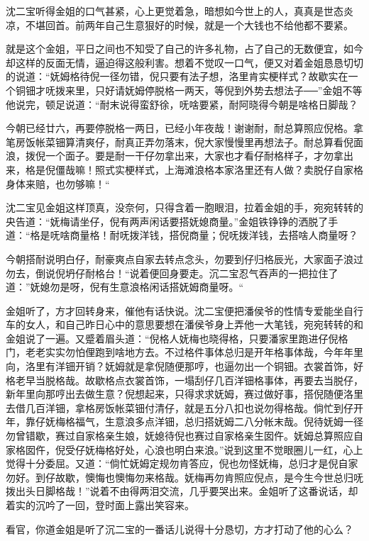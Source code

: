 \documentclass[12pt,UTF8]{ctexbook}
\begin{document}
{{{沈二宝听得金姐的口气甚紧，心上更觉着急，暗想如今世上的人，真真是世态炎凉，不堪回首。前两年自己生意狠好的时候，就是一个大钱也不给他都不要紧。

就是这个金姐，平日之间也不知受了自己的许多礼物，占了自己的无数便宜，如今却这样的反面无情，逼迫得这般利害。想着不觉叹一口气，便又对着金姐恳恳切切的说道：“妩姆格待倪一径勿错，倪只要有法子想，洛里肯实梗样式？故歇实在一个铜钿才呒拨来里，只好请妩姆停脱格一两天，等倪到外势去想法子──”金姐不等他说完，顿足说道：“耐末说得蛮舒徐，呒啥要紧，耐阿晓得今朝是啥格日脚哉？

今朝已经廿六，再要停脱格一两日，已经小年夜哉！谢谢耐，耐总算照应倪格。拿笔房饭帐菜钿算清爽仔，耐真正弄勿落末，倪大家慢慢里再想法子。耐总算看倪面浪，拨倪一个面子。要是耐一干仔勿拿出来，大家也才看仔耐格样子，才勿拿出来，格是倪僵哉嘛！照式实梗样式，上海滩浪格本家洛里还有人做？卖脱仔自家格身体来赔，也勿够嘛！“

沈二宝见金姐这样顶真，没奈何，只得含着一胞眼泪，拉着金姐的手，宛宛转转的央告道：“妩梅请坐仔，倪有两声闲话要搭妩媳商量。”金姐铁铮铮的洒脱了手道：“格是呒啥商量格！耐呒拨洋钱，搭倪商量；倪呒拨洋钱，去搭啥人商量呀？

今朝搭耐说明白仔，耐豪爽点自家去转点念头，勿要到仔归格辰光，大家面子浪过勿去，倒说倪坍仔耐格台！“说着便回身要走。沉二宝忍气吞声的一把拉住了道：”妩媳勿是呀，倪有生意浪格闲话搭妩姆商量呀。“

金姐听了，方才回转身来，催他有话快说。沈二宝便把潘侯爷的性情专爱能坐自行车的女人，和自己昨日心中的意思要想在潘侯爷身上弄他一大笔钱，宛宛转转的和金姐说了一遍。又蹙着眉头道：“倪格人妩梅也晓得格，只要潘家里跑进仔倪格门，老老实实勿怕俚跑到啥地方去。不过格件事体总归是开年格事体哉，今年年里向，洛里有洋钿开销？妩姆就是拿倪随便那哼，也逼勿出一个铜钿。衣裳首饰，好格老早当脱格哉。故歇格点衣裳首饰，一塌刮仔几百洋钿格事体，再要去当脱仔，新年里向那哼出去做生意？倪想起来，只得求求妩姆，赛过做好事，搭倪随便洛里去借几百洋钿，拿格房饭帐菜钿付清仔，就是五分八扣也说勿得格哉。倘忙到仔开年，靠仔妩梅格福气，生意浪多点洋钿，总归搭妩姆二八分帐末哉。倪待妩姆一径勿曾错歇，赛过自家格亲生娘，妩媳待倪也赛过自家格亲生囡仵。妩姆总算照应自家格囡仵，倪受仔妩梅格好处，心浪也明白来浪。”说到这里不觉眼圈儿一红，心上觉得十分委屈。又道：“倘忙妩姆定规勿肯答应，倪也勿怪妩梅，总归才是倪自家勿好。到仔故歇，懊悔也懊悔勿来格哉。妩梅再勿肯照应倪点，是今生今世总归呒拨出头日脚格哉！”说着不由得两泪交流，几乎要哭出来。金姐听了这番说话，却着实的沉吟了一回，登时面上露出笑容来。

看官，你道金姐是听了沉二宝的一番话儿说得十分恳切，方才打动了他的心么？

}}}
\end{document}
